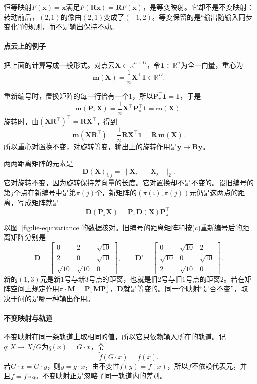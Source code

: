 恒等映射$F(\bm x)=\bm x$满足$F(\bm R\bm x)=\bm R F(\bm x)$，是等变映射。它却不是不变映射：转动前后，$(2,1)$的像由$(2,1)$变成了$(-1,2)$。等变保留的是“输出随输入同步变化”的规则，而不是输出保持不动。

\paragraph{点云上的例子}
把上面的计算写成一般形式。对点云$\bm X\in\mathbb R^{n\times D}$，令$\bm 1\in\mathbb R^n$为全一向量，重心为
\[
\bm m(\bm X)=\frac1n\bm X^\top\bm 1\in\mathbb R^D .
\]

重新编号时，置换矩阵的每一行恰有一个$1$，所以$\bm P_\pi^\top\bm 1=\bm 1$，于是
\[
\bm m(\bm P_\pi\bm X)=\frac1n\bm X^\top\bm P_\pi^\top\bm 1=\bm m(\bm X).
\]
旋转时，由$(\bm X\bm R^\top)^\top=\bm R\bm X^\top$，得到
\[
\bm m(\bm X\bm R^\top)=\frac1n\bm R\bm X^\top\bm 1=\bm R\,\bm m(\bm X).
\]
所以重心对置换不变，对旋转等变，输出上的旋转作用是$\bm y\mapsto\bm R\bm y$。

两两距离矩阵的元素是
\[
\bm D(\bm X)_{i,j}=\lVert\bm X_{i,:}-\bm X_{j,:}\rVert_2 .
\]
它对旋转不变，因为旋转保持差向量的长度。它对置换却不是不变的。设旧编号的第$j$个点在新编号中是第$\pi(j)$个，新矩阵的$(\pi(i),\pi(j))$元仍是这两点的距离，写成矩阵就是
\[
\bm D(\bm P_\pi\bm X)=\bm P_\pi\bm D(\bm X)\bm P_\pi^\top .
\]

以图~\ref{fig:lie-equivariance}的数据核对。旧编号的距离矩阵和按(c)重新编号后的距离矩阵分别是
\[
\bm D=\begin{bmatrix}0&2&\sqrt{10}\\2&0&\sqrt{10}\\\sqrt{10}&\sqrt{10}&0\end{bmatrix},\qquad
\bm D'=\begin{bmatrix}0&\sqrt{10}&2\\\sqrt{10}&0&\sqrt{10}\\2&\sqrt{10}&0\end{bmatrix}.
\]
新的$(1,3)$元是新$1$号与新$3$号点的距离，也就是旧$2$号与旧$1$号点的距离$2$。若在矩阵空间上规定作用$\pi\cdot\bm M=\bm P_\pi\bm M\bm P_\pi^\top$，$\bm D$就是等变的。同一个映射“是否不变”，取决于问的是哪一种输出作用。

\paragraph{不变映射与轨道}
不变映射在同一条轨道上取相同的值，所以它只依赖输入所在的轨道。记$q:X\to X/G$为$q(x)=G\cdot x$，令
\[
\widetilde f(G\cdot x)=f(x).
\]
若$G\cdot x=G\cdot y$，则$y=g\cdot x$，由不变性$f(y)=f(x)$，所以$\widetilde f$不依赖代表元，并且$f=\widetilde f\circ q$。不变映射正是忽略了同一轨道内的差别。

